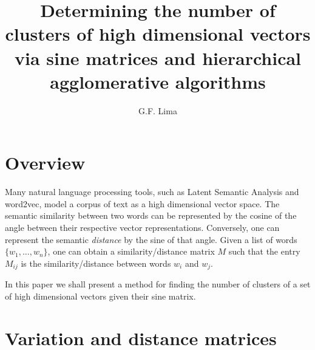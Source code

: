 \documentclass[12pt]{article}
\title{Determining the number of clusters of high dimensional vectors via sine matrices and hierarchical agglomerative algorithms}
\author{G.F. Lima}
\date{} %
\begin{document}
\maketitle

\section{Overview}

Many natural language processing tools, such as Latent Semantic Analysis and word2vec, model a corpus of text as a high dimensional vector space. The semantic similarity between two words can be represented by the cosine of the angle between their respective vector representations. Conversely, one can represent the semantic \emph{distance} by the sine of that angle. Given a list of words $\{ w_1, \ldots, w_n \}$, one can obtain a similarity/distance matrix $M$ such that the entry ${M}_{ij}$  is the similarity/distance between words $w_i$ and $w_j$.

In this paper we shall present a method for finding the number of clusters of a set of high dimensional vectors given their sine matrix.  
\section{Variation and distance matrices}
\end{document}
